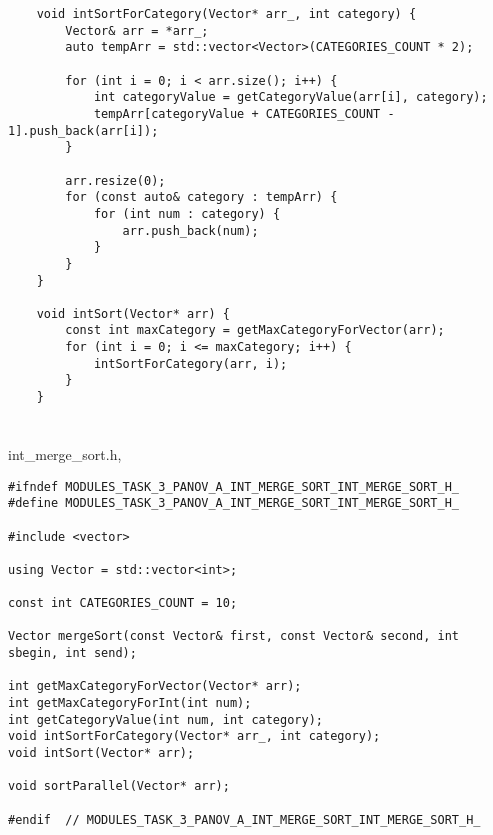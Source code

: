 \documentclass[12pt,a4paper]{article}
\begin{document}
\begin{lstlisting}
	void intSortForCategory(Vector* arr_, int category) {
		Vector& arr = *arr_;
		auto tempArr = std::vector<Vector>(CATEGORIES_COUNT * 2);
		
		for (int i = 0; i < arr.size(); i++) {
			int categoryValue = getCategoryValue(arr[i], category);
			tempArr[categoryValue + CATEGORIES_COUNT - 1].push_back(arr[i]);
		}
		
		arr.resize(0);
		for (const auto& category : tempArr) {
			for (int num : category) {
				arr.push_back(num);
			}
		}
	}
	
	void intSort(Vector* arr) {
		const int maxCategory = getMaxCategoryForVector(arr);
		for (int i = 0; i <= maxCategory; i++) {
			intSortForCategory(arr, i);
		}
	}
\end{lstlisting}

\section{} int\_merge\_sort.h,
\begin{lstlisting}
#ifndef MODULES_TASK_3_PANOV_A_INT_MERGE_SORT_INT_MERGE_SORT_H_
#define MODULES_TASK_3_PANOV_A_INT_MERGE_SORT_INT_MERGE_SORT_H_

#include <vector>

using Vector = std::vector<int>;

const int CATEGORIES_COUNT = 10;

Vector mergeSort(const Vector& first, const Vector& second, int sbegin, int send);

int getMaxCategoryForVector(Vector* arr);
int getMaxCategoryForInt(int num);
int getCategoryValue(int num, int category);
void intSortForCategory(Vector* arr_, int category);
void intSort(Vector* arr);

void sortParallel(Vector* arr);

#endif  // MODULES_TASK_3_PANOV_A_INT_MERGE_SORT_INT_MERGE_SORT_H_
\end{lstlisting}
\end{document}
